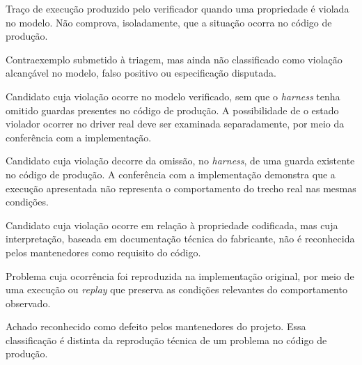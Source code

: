 \begin{tcolorbox}[colback=gray!4!white, colframe=gray!55!black,
boxrule=0.6pt, arc=2pt, left=8pt, right=8pt, top=6pt, bottom=6pt,
title={\textbf{Classificação dos achados}}]
\footnotesize
\begin{description}[leftmargin=3.0cm, style=nextline, font=\normalfont\bfseries]

\item[Contraexemplo] Traço de execução produzido pelo verificador quando uma propriedade é violada no modelo. Não comprova, isoladamente, que a situação ocorra no código de produção.

\item[Candidato] Contraexemplo submetido à triagem, mas ainda não classificado como violação alcançável no modelo, falso positivo ou especificação disputada.

\item[Violação alcançável no modelo (VAM)] Candidato cuja violação ocorre no modelo verificado, sem que o \textit{harness} tenha omitido guardas presentes no código de produção. A possibilidade de o estado violador ocorrer no driver real deve ser examinada separadamente, por meio da conferência com a implementação.

\item[Falso positivo] Candidato cuja violação decorre da omissão, no \textit{harness}, de uma guarda existente no código de produção. A conferência com a implementação demonstra que a execução apresentada não representa o comportamento do trecho real nas mesmas condições.

\item[Especificação disputada] Candidato cuja violação ocorre em relação à propriedade codificada, mas cuja interpretação, baseada em documentação técnica do fabricante, não é reconhecida pelos mantenedores como requisito do código.

\item[Defeito reproduzido no código de produção] Problema cuja ocorrência foi reproduzida na implementação original, por meio de uma execução ou \textit{replay} que preserva as condições relevantes do comportamento observado.

\item[Defeito confirmado] Achado reconhecido como defeito pelos mantenedores do projeto. Essa classificação é distinta da reprodução técnica de um problema no código de produção.

\end{description}
\end{tcolorbox}


